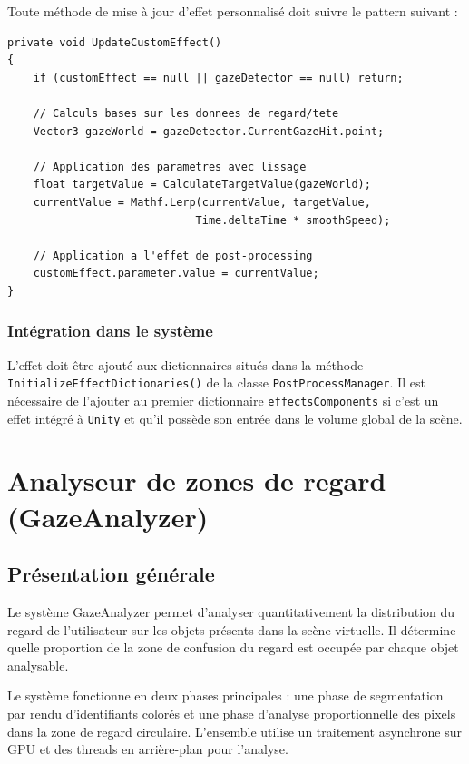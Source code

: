 \documentclass[12pt]{report}
\begin{document}
Toute méthode de mise à jour d'effet personnalisé doit suivre le pattern suivant :

{\small
\lstset{style=sharpc}
\begin{lstlisting}
private void UpdateCustomEffect()
{
    if (customEffect == null || gazeDetector == null) return;
    
    // Calculs bases sur les donnees de regard/tete
    Vector3 gazeWorld = gazeDetector.CurrentGazeHit.point;
    
    // Application des parametres avec lissage
    float targetValue = CalculateTargetValue(gazeWorld);
    currentValue = Mathf.Lerp(currentValue, targetValue, 
                             Time.deltaTime * smoothSpeed);
    
    // Application a l'effet de post-processing
    customEffect.parameter.value = currentValue;
}
\end{lstlisting}
}

\subsection{Intégration dans le système}

L'effet doit être ajouté aux dictionnaires situés dans la méthode \texttt{InitializeEffectDictionaries()} de la classe \texttt{PostProcessManager}. Il est nécessaire de l'ajouter au premier dictionnaire \texttt{effectsComponents} si c'est un effet intégré à \texttt{Unity} et qu'il possède son entrée dans le volume global de la scène.

\chapter{Analyseur de zones de regard (GazeAnalyzer)}
\section{Présentation générale}
Le système GazeAnalyzer permet d'analyser quantitativement la distribution du regard de l'utilisateur sur les objets présents dans la scène virtuelle. Il détermine quelle proportion de la zone de confusion du regard est occupée par chaque objet analysable.

Le système fonctionne en deux phases principales : une phase de segmentation par rendu d'identifiants colorés et une phase d'analyse proportionnelle des pixels dans la zone de regard circulaire. L'ensemble utilise un traitement asynchrone sur GPU et des threads en arrière-plan pour l'analyse.
\end{document}
